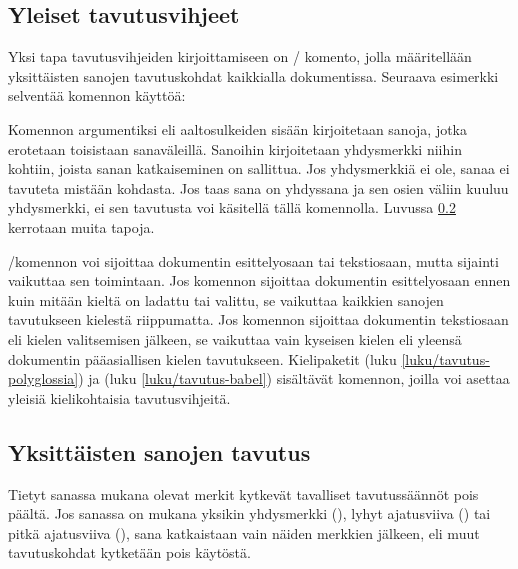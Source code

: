 \subsection{Yleiset tavutusvihjeet}
\label{luku/hyphenation-komento}

Yksi tapa tavutusvihjeiden kirjoittamiseen on \-/
komento, jolla määritellään yksittäisten sanojen tavutuskohdat
kaikkialla dokumentissa. Seuraava esimerkki selventää komennon käyttöä:

\begin{koodilohkosis}
\end{koodilohkosis}

\noindent
Komennon argumentiksi eli aaltosulkeiden sisään kirjoitetaan sanoja,
jotka erotetaan toisistaan sanaväleillä. Sanoihin kirjoitetaan
yhdysmerkki niihin kohtiin, joista sanan katkaiseminen on sallittua. Jos
yhdysmerkkiä ei ole, sanaa ei tavuteta mistään kohdasta. Jos taas sana
on yhdyssana ja sen osien väliin kuuluu yhdysmerkki, ei sen tavutusta
voi käsitellä tällä komennolla. Luvussa \ref{luku/tavutuksen-merkit}
kerrotaan muita tapoja.

\-/komennon voi sijoittaa dokumentin esittelyosaan
tai tekstiosaan, mutta sijainti vaikuttaa sen toimintaan. Jos komennon
sijoittaa dokumentin esittelyosaan ennen kuin mitään kieltä on ladattu
tai valittu, se vaikuttaa kaikkien sanojen tavutukseen kielestä
riippumatta. Jos komennon sijoittaa dokumentin tekstiosaan eli kielen
valitsemisen jälkeen, se vaikuttaa vain kyseisen kielen eli yleensä
dokumentin pääasiallisen kielen tavutukseen. Kielipaketit
 (luku \ref{luku/tavutus-polyglossia}) ja
 (luku \ref{luku/tavutus-babel}) sisältävät komennon,
joilla voi asettaa yleisiä kielikohtaisia tavutusvihjeitä.

\subsection{Yksittäisten sanojen tavutus}
\label{luku/tavutuksen-merkit}

Tietyt sanassa mukana olevat merkit kytkevät tavalliset tavutussäännöt
pois päältä. Jos sanassa on mukana yksikin yhdysmerkki (\koodi{\=/}),
lyhyt ajatusviiva (\mbox{\koodi{--}}) tai pitkä ajatusviiva
(\mbox{\koodi{---}}), sana katkaistaan vain näiden merkkien jälkeen, eli
muut tavutuskohdat kytketään pois käytöstä.

